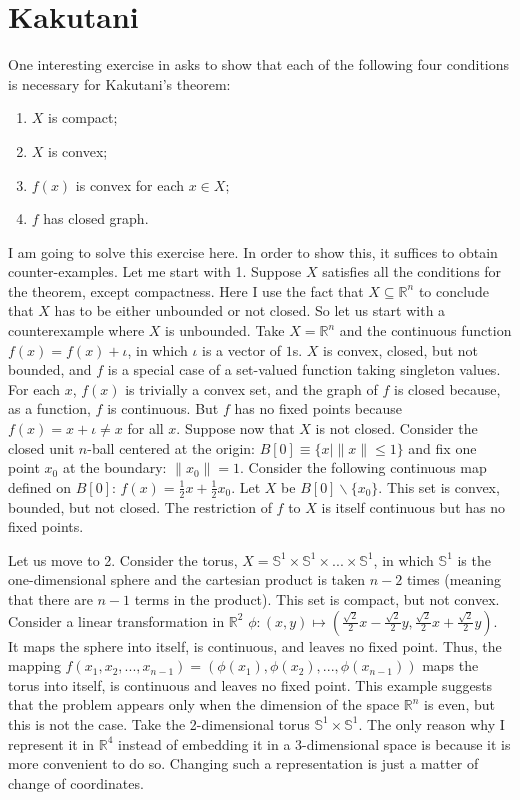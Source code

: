 \documentclass[../main.tex]{subfiles}
\begin{document}
\section{Kakutani}
One interesting exercise in \cite{OR} asks to show that each of the following four conditions is necessary for Kakutani's theorem:
    \begin{enumerate}
        \item $X$ is compact;
        \item $X$ is convex;
        \item $f(x)$ is convex for each $x\in X$;
        \item $f$ has closed graph.
    \end{enumerate}

I am going to solve this exercise here. In order to show this, it suffices to obtain counter-examples. Let me start with 1. Suppose $X$ satisfies all the conditions for the theorem, except compactness. Here I use the fact that $X\subseteq\mathbb{R}^n$ to conclude that $X$ has to be either unbounded or not closed. So let us start with a counterexample where $X$ is unbounded. Take $X = \mathbb{R}^n$ and the continuous function $f(x) = f(x) + \iota$, in which $\iota$ is a vector of $1$s. $X$ is convex, closed, but not bounded, and $f$ is a special case of a set-valued function taking singleton values. For each $x$, $f(x)$ is trivially a convex set, and the graph of $f$ is closed because, as a function, $f$ is continuous. But $f$ has no fixed points because $f(x)=x+\iota\neq x$ for all $x$. Suppose now that $X$ is not closed. Consider the closed unit $n$-ball centered at the origin: $B[0]\equiv\{x|\|x\|\le1\}$ and fix one point $x_0$ at the boundary: $\|x_0\| = 1$. Consider the following continuous map defined on $B[0]$: $f(x) = \frac{1}{2}x + \frac{1}{2}x_0$. Let $X$ be $B[0]\backslash \{x_0\}$. This set is convex, bounded, but not closed. The restriction of $f$ to $X$ is itself continuous but has no fixed points.

    Let us move to 2. Consider the torus, $X = \mathbb{S}^1\times\mathbb{S}^1\times...\times\mathbb{S}^1$, in which $\mathbb{S}^1$ is the one-dimensional sphere and the cartesian product is taken $n-2$ times (meaning that there are $n-1$ terms in the product). This set is compact, but not convex. Consider a linear transformation in $\mathbb{R}^2$ $\phi\colon(x,y)\mapsto \left(\frac{\sqrt{2}}{2}x-\frac{\sqrt{2}}{2}y,\frac{\sqrt{2}}{2}x + \frac{\sqrt{2}}{2}y\right)$. It maps the sphere into itself, is continuous, and leaves no fixed point. Thus, the mapping $f(x_1,x_2,...,x_{n-1}) = (\phi(x_1), \phi(x_2), ..., \phi(x_{n-1}))$ maps the torus into itself, is continuous and leaves no fixed point. This example suggests that the problem appears only when the dimension of the space $\mathbb{R}^n$ is even, but this is not the case. Take the 2-dimensional torus $\mathbb{S}^1\times\mathbb{S}^1$. The only reason why I represent it in $\mathbb{R}^4$ instead of embedding it in a $3$-dimensional space is because it is more convenient to do so. Changing such a representation is just a matter of change of coordinates.
\end{document}
